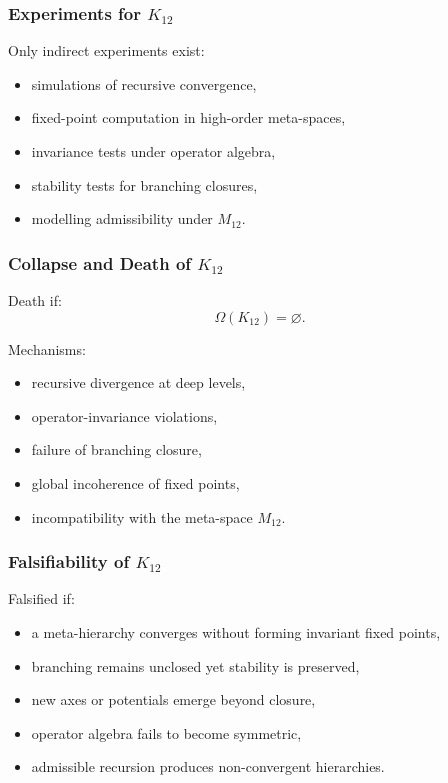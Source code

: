 \subsubsection{Experiments for $K_{12}$}

Only indirect experiments exist:
\begin{itemize}
    \item simulations of recursive convergence,
    \item fixed-point computation in high-order meta-spaces,
    \item invariance tests under operator algebra,
    \item stability tests for branching closures,
    \item modelling admissibility under $M_{12}$.
\end{itemize}

\subsubsection{Collapse and Death of $K_{12}$}

Death if:
\[
\Omega(K_{12})=\varnothing.
\]

Mechanisms:
\begin{itemize}
    \item recursive divergence at deep levels,
    \item operator-invariance violations,
    \item failure of branching closure,
    \item global incoherence of fixed points,
    \item incompatibility with the meta-space $M_{12}$.
\end{itemize}

\subsubsection{Falsifiability of $K_{12}$}

Falsified if:
\begin{itemize}
    \item a meta-hierarchy converges without forming invariant fixed points,
    \item branching remains unclosed yet stability is preserved,
    \item new axes or potentials emerge beyond closure,
    \item operator algebra fails to become symmetric,
    \item admissible recursion produces non-convergent hierarchies.
\end{itemize}

